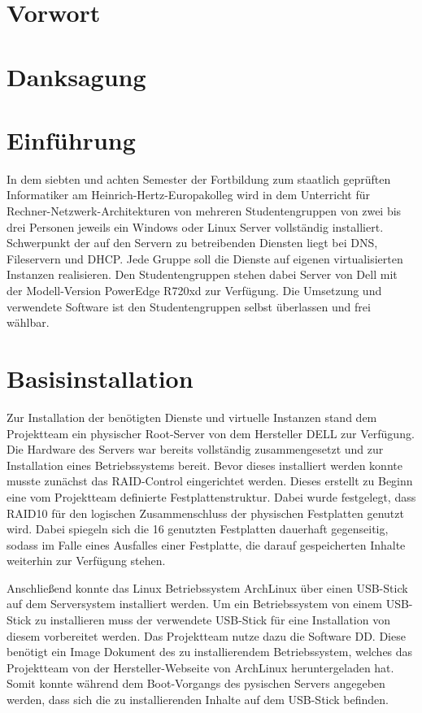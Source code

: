 \chapter*{Vorwort}

\chapter*{Danksagung}

\newpage

\tableofcontents
\listoffigures
\begingroup
\let\clearpage\relax
\lstlistoflistings{}
\listoftables
\endgroup

\chapter{Einführung}
\label{chap:einfuehrung}
In dem siebten und achten Semester der Fortbildung zum staatlich geprüften
Informatiker am Heinrich\hyp{}Hertz\hyp{}Europakolleg wird in dem Unterricht
für Rechner\hyp{}Netzwerk\hyp{}Architekturen von mehreren Studentengruppen von
zwei bis drei Personen jeweils ein Windows oder Linux Server vollständig
installiert. Schwerpunkt der auf den Servern zu betreibenden Diensten liegt bei
DNS, Fileservern und DHCP. Jede Gruppe soll die Dienste auf eigenen
virtualisierten Instanzen realisieren. Den Studentengruppen stehen dabei Server
von Dell mit der Modell-Version PowerEdge R720xd zur Verfügung. Die Umsetzung
und verwendete Software ist den Studentengruppen selbst überlassen und frei
wählbar.

\chapter{Basisinstallation}
\label{chap:basisinstallation}
Zur Installation der benötigten Dienste und virtuelle Instanzen stand dem
Projektteam ein physischer Root-Server von dem Hersteller DELL zur Verfügung.
Die Hardware des Servers war bereits vollständig zusammengesetzt und zur
Installation eines Betriebssystems bereit. Bevor dieses installiert werden
konnte musste zunächst das RAID\hyp{}Control eingerichtet werden. Dieses
erstellt zu Beginn eine vom Projektteam definierte Festplattenstruktur. Dabei
wurde festgelegt, dass RAID10 für den logischen Zusammenschluss der physischen
Festplatten genutzt wird. Dabei spiegeln sich die 16 genutzten Festplatten
dauerhaft gegenseitig, sodass im Falle eines Ausfalles einer Festplatte, die
darauf gespeicherten Inhalte weiterhin zur Verfügung stehen.

Anschließend konnte das Linux Betriebssystem ArchLinux über einen
USB\hyp{}Stick auf dem Serversystem installiert werden. Um ein Betriebssystem
von einem USB\hyp{}Stick zu installieren muss der verwendete USB\hyp{}Stick
für eine Installation von diesem vorbereitet werden. Das Projektteam nutze
dazu die Software DD. Diese benötigt ein Image Dokument des zu installierendem
Betriebssystem, welches das Projektteam von der Hersteller\hyp{}Webseite von
ArchLinux heruntergeladen hat. Somit konnte während dem Boot\hyp{}Vorgangs des
pysischen Servers angegeben werden, dass sich die zu installierenden Inhalte
auf dem USB\hyp{}Stick befinden.

